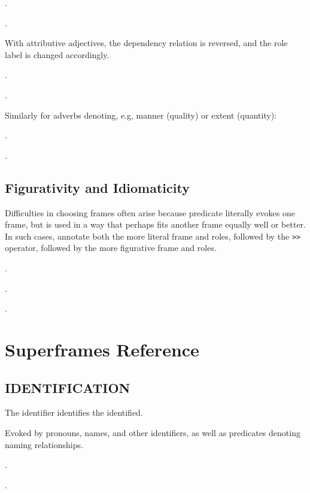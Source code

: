 \documentclass[a4paper]{article}
\newcommand{\fr}[1]{\textsf{#1}}
\newcommand{\rl}[1]{\textsf{#1}}
\begin{document}
\ex.

\ex.

With attributive adjectives, the dependency relation is reversed, and the role label is changed accordingly.

\ex.

\ex.

Similarly for adverbs denoting, e.g, manner (\rl{quality}) or extent (\rl{quantity}):

\ex.

\ex.

\subsection{Figurativity and Idiomaticity}

Difficulties in choosing frames often arise because predicate literally evokes
one frame, but is used in a way that perhaps fits another frame equally well or
better. In such cases, annotate both the more literal frame and roles, followed
by the \texttt{>}\texttt{>} operator, followed by the more figurative frame and
roles.

\ex.

\ex.

\ex.

\section{Superframes Reference}

\subsection{\fr{IDENTIFICATION}}
\label{sec:IDENTIFICATION}

The \rl{identifier} identifies the \rl{identified}.

Evoked by pronouns, names, and other identifiers, as well as predicates
denoting naming relationships.

\ex.

\ex.
\end{document}

